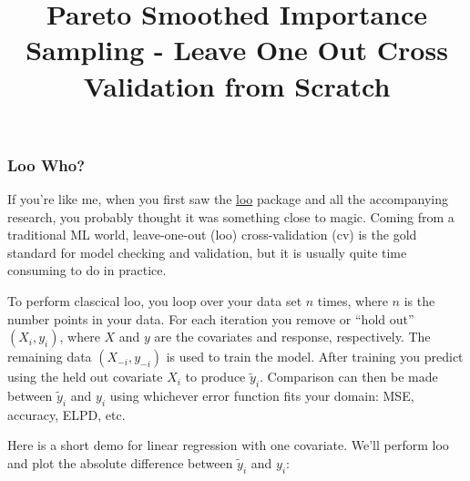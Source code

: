\documentclass[
  letterpaper,
  DIV=11,
  numbers=noendperiod]{scrartcl}
\title{Pareto Smoothed Importance Sampling - Leave One Out Cross
Validation from Scratch}
\author{}
\date{}
\renewcommand*\contentsname{Table of contents}
\newcommand\contentsname{Table of contents}
\begin{document}
\maketitle

\renewcommand*\contentsname{Table of contents}
{
\hypersetup{linkcolor=}
\setcounter{tocdepth}{3}
\tableofcontents
}

\subsubsection{Loo Who?}\label{loo-who}

If you're like me, when you first saw the
\href{https://mc-stan.org/loo/}{loo} package and all the accompanying
research, you probably thought it was something close to magic. Coming
from a traditional ML world, leave-one-out (loo) cross-validation (cv)
is the gold standard for model checking and validation, but it is
usually quite time consuming to do in practice.

To perform clascical loo, you loop over your data set \(n\) times, where
\(n\) is the number points in your data. For each iteration you remove
or ``hold out'' \((X_i, y_i)\), where \(X\) and \(y\) are the covariates
and response, respectively. The remaining data \((X_{-i}, y_{-i})\) is
used to train the model. After training you predict using the held out
covariate \(X_i\) to produce \(\tilde{y}_i\). Comparison can then be
made between \(\tilde{y}_i\) and \(y_i\) using whichever error function
fits your domain: MSE, accuracy, ELPD, etc.

Here is a short demo for linear regression with one covariate. We'll
perform loo and plot the absolute difference between \(\tilde{y}_i\) and
\(y_i\):
\end{document}
